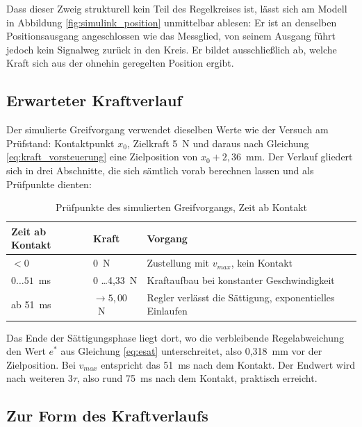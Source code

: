 Dass dieser Zweig strukturell kein Teil des Regelkreises ist, lässt sich am Modell in
Abbildung \ref{fig:simulink_position} unmittelbar ablesen: Er ist an denselben
Positionsausgang angeschlossen wie das Messglied, von seinem Ausgang führt jedoch kein
Signalweg zurück in den Kreis. Er bildet ausschließlich ab, welche Kraft sich aus der
ohnehin geregelten Position ergibt.

\subsection*{Erwarteter Kraftverlauf}

Der simulierte Greifvorgang verwendet dieselben Werte wie der Versuch am Prüfstand:
Kontaktpunkt $x_0$, Zielkraft 5~N und daraus nach Gleichung \ref{eq:kraft_vorsteuerung}
eine Zielposition von $x_0 + 2{,}36$~mm. Der Verlauf gliedert sich in drei Abschnitte,
die sich sämtlich vorab berechnen lassen und als Prüfpunkte dienten:

\begin{table}[htbp]
    \centering
    \caption{Prüfpunkte des simulierten Greifvorgangs, Zeit ab Kontakt}
    \label{tab:sim_kraft}
    \begin{tabular}{llp{7cm}}
        \hline
        Zeit ab Kontakt & Kraft & Vorgang \\
        \hline
        $< 0$                     & 0~N             & Zustellung mit $v_{max}$, kein Kontakt \\
        $0 \ldots 51$~ms          & 0 \ldots 4,33~N & Kraftaufbau bei konstanter Geschwindigkeit \\
        ab 51~ms                  & $\to 5{,}00$~N  & Regler verlässt die Sättigung, exponentielles Einlaufen \\
        \hline
    \end{tabular}
\end{table}

Das Ende der Sättigungsphase liegt dort, wo die verbleibende Regelabweichung den Wert
$e^{*}$ aus Gleichung \ref{eq:esat} unterschreitet, also 0,318~mm vor der Zielposition.
Bei $v_{max}$ entspricht das 51~ms nach dem Kontakt. Der Endwert wird nach weiteren
$3\tau$, also rund 75~ms nach dem Kontakt, praktisch erreicht.

\subsection*{Zur Form des Kraftverlaufs}

